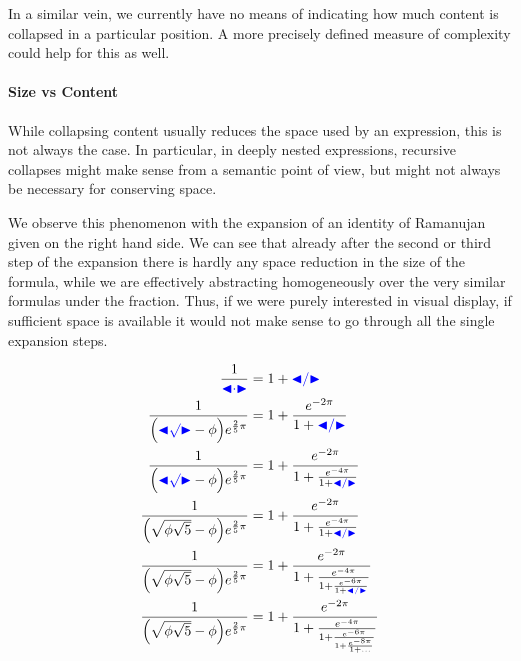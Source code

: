 \documentclass{llncs}
\def\collapse#1{\textcolor{blue}{\ensuremath{\mathord{\blacktriangleleft}\mathord{#1}
\mathord{\blacktriangleright}}}}
\begin{document}
In a similar vein, we currently have no means of indicating how much content is
collapsed in a particular position. A more precisely defined measure of
complexity could help for this as well.

\noindent\begin{minipage}{.55\linewidth}
\paragraph{Size vs Content}
  While collapsing content usually reduces the space used by an expression, this
  is not always the case.  In particular, in deeply nested expressions,
  recursive collapses might make sense from a semantic point of view, but might
  not always be necessary for conserving space.

  \hspace{1.5em}We observe this phenomenon with the expansion of an identity of Ramanujan
  given on the right hand side.  We can see that already after the second or
  third step of the expansion there is hardly any space reduction in the size of
  the formula, while we are effectively abstracting homogeneously over the very
  similar formulas under the fraction.  Thus, if we were purely interested in
  visual display, if sufficient space is available it would not make sense to go
  through all the single expansion steps.
\end{minipage}
\begin{minipage}{.44\linewidth}\small
  \begin{align*}
    \frac{1}{\collapse{\cdot}} &= 1 + \collapse{/}\\
    \frac{1}{\Bigl(\collapse{\surd}-\phi\Bigr)
    e^{\frac25\pi}} &=
                      1+\frac{e^{-2\pi}}
                      {1+\collapse{/}}\\
    \frac{1}{\Bigl(\collapse{\surd}-\phi\Bigr)
    e^{\frac25\pi}} &=
                      1+\frac{e^{-2\pi}}
                      {1+\frac{e^{-4\pi}}
                      {1+\collapse{/}}
                      }\\
    \frac{1}{\Bigl(\sqrt{\phi\sqrt{5}}-\phi\Bigr)
    e^{\frac25\pi}} &=
                      1+\frac{e^{-2\pi}}
                      {1+\frac{e^{-4\pi}}
                      {1+\collapse{/}}
                      }\\
    \frac{1}{\Bigl(\sqrt{\phi\sqrt{5}}-\phi\Bigr)
    e^{\frac25\pi}} &=
                      1+\frac{e^{-2\pi}}
                      {1+\frac{e^{-4\pi}}
                      {1+\frac{e^{-6\pi}}
                      {1+\collapse{/}}}}
    \\
    \frac{1}{\Bigl(\sqrt{\phi\sqrt{5}}-\phi\Bigr)
    e^{\frac25\pi}} &=
                      1+\frac{e^{-2\pi}}
                      {1+\frac{e^{-4\pi}}
                      {1+\frac{e^{-6\pi}}
                      {1+\frac{e^{-8\pi}}
                      {1+\ldots} } } }
  \end{align*}
\end{minipage}
\end{document}

